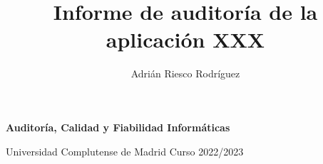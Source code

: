 

\usepackage{pgf}
\usepackage{tikz}
\usepackage{url}
\usepackage{hyperref}
\usepackage{xcolor,colortbl}


\newcommand{\ojos}{%
  \unitlength=0.7mm
  \special{em:linewidth 0.4pt}
  \linethickness{0.4pt}
  \begin{picture}(6.00,4.00)
    \put(2.00,2.00){\circle{4.00}}
    \put(6.00,2.00){\circle{4.00}}
    \put(3.00,2.00){\circle*{2.00}}
    \put(7.00,2.00){\circle*{2.00}}
  \end{picture}
}%

\newcommand{\OJO}[1]{%
   \ojos\ {\bf [}{#1}{\bf ]}
}%

\usepackage{wasysym}     

\setlength{\marginparwidth}{1.2in}
\let\oldmarginpar\marginpar
\renewcommand\marginpar[1]{\-\oldmarginpar[\raggedleft #1]%
{\raggedright #1}}    

\newenvironment{checklist}{%
  \begin{list}{}{}%
  \let\olditem\item
  \renewcommand\item{\olditem -- \marginpar{$\Box$} }
  \newcommand\checkeditem{\olditem -- \marginpar{$\CheckedBox$} }
}{%
  \end{list}
}   



\begin{center}
{\Large\textbf{Auditor\'ia, Calidad y Fiabilidad Inform\'aticas}}
\smallskip

\large
Universidad Complutense de Madrid \qquad Curso 2022/2023
\medskip

\end{center}

\title{Informe de auditor\'ia de la aplicaci\'on XXX}
\author{Adri\'an Riesco Rodr\'iguez}
\date{}
\maketitle


